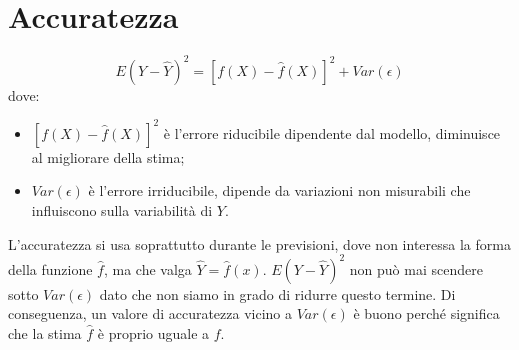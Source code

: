 \section{Accuratezza}
\[ E(Y-\hat{Y})^2 = [f(X) - \hat{f}(X)]^2 + Var(\epsilon) \]
dove:
\begin{itemize}
 \item $[f(X) - \hat{f}(X)]^2$ \`e l'errore riducibile dipendente dal 
modello, diminuisce al migliorare della stima;
 \item $Var(\epsilon)$ \`e l'errore irriducibile, dipende da variazioni non 
misurabili che influiscono sulla variabilit\`a di $Y$.
\end{itemize}
L'accuratezza si usa soprattutto durante le previsioni, dove non interessa la forma della funzione $\hat{f}$, ma che valga $\hat{Y} = \hat{f}(x)$. $E(Y-\hat{Y})^2$ non può mai scendere sotto $Var(\epsilon)$ dato che non siamo in grado di ridurre questo termine. Di conseguenza, un valore di accuratezza vicino a $Var(\epsilon)$ è buono perché significa che la stima $\hat{f}$ è proprio uguale a $f$.
